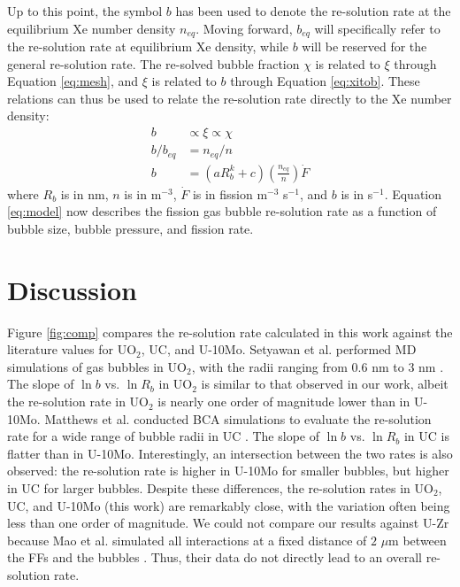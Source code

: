 \documentclass[review]{elsarticle}
\begin{document}
Up to this point, the symbol $b$ has been used to denote the re-solution rate at the equilibrium Xe number density $n_{eq}$. Moving forward, $b_{eq}$ will specifically refer to the re-solution rate at equilibrium Xe density, while $b$ will be reserved for the general re-solution rate. The re-solved bubble fraction $\chi$ is related to $\xi$ through Equation \ref{eq:mesh}, and $\xi$ is related to $b$ through Equation \ref{eq:xitob}. These relations can thus be used to relate the re-solution rate directly to the Xe number density:
\begin{align}
	b &\propto \xi \propto \chi \\
	b / b_{eq} &= n_{eq} / n \\
	b &= \left( a R_b^k + c \right) \left( \frac{n_{eq}}{n} \right) \dot{F}
	\label{eq:model}
\end{align}
where $R_b$ is in nm, $n$ is in m$^{-3}$, $\dot{F}$ is in fission m$^{-3}$ s$^{-1}$, and $b$ is in s$^{-1}$. Equation \ref{eq:model} now describes the fission gas bubble re-solution rate as a function of bubble size, bubble pressure, and fission rate.


\section{Discussion}

Figure \ref{fig:comp} compares the re-solution rate calculated in this work against the literature values for UO$_2$, UC, and U-10Mo. Setyawan et al. performed MD simulations of gas bubbles in UO$_2$, with the radii ranging from $0.6$ nm to $3$ nm \cite{setyawan2018}. The slope of $\ln b$ vs. $\ln R_b$ in UO$_2$ is similar to that observed in our work, albeit the re-solution rate in UO$_2$ is nearly one order of magnitude lower than in U-10Mo. Matthews et al. conducted BCA simulations to evaluate the re-solution rate for a wide range of bubble radii in UC \cite{matthews2015}. The slope of $\ln b$ vs. $\ln R_b$ in UC is flatter than in U-10Mo. Interestingly, an intersection between the two rates is also observed: the re-solution rate is higher in U-10Mo for smaller bubbles, but higher in UC for larger bubbles. Despite these differences, the re-solution rates in UO$_2$, UC, and U-10Mo (this work) are remarkably close, with the variation often being less than one order of magnitude. We could not compare our results against U-Zr because Mao et al. simulated all interactions at a fixed distance of $2$ $\mu$m between the FFs and the bubbles \cite{mao2025}. Thus, their data do not directly lead to an overall re-solution rate.
\end{document}
